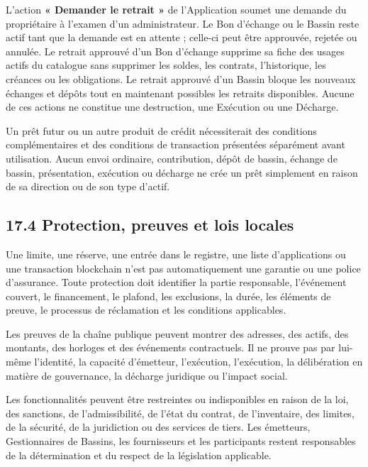 \documentclass[11pt]{article}
\begin{document}
L'action \textbf{« Demander le retrait »} de l'Application soumet une demande du propriétaire à l'examen d'un administrateur. Le Bon d'échange ou le Bassin reste actif tant que la demande est en attente ; celle-ci peut être approuvée, rejetée ou annulée. Le retrait approuvé d'un Bon d'échange supprime sa fiche des usages actifs du catalogue sans supprimer les soldes, les contrats, l'historique, les créances ou les obligations. Le retrait approuvé d'un Bassin bloque les nouveaux échanges et dépôts tout en maintenant possibles les retraits disponibles. Aucune de ces actions ne constitue une destruction, une Exécution ou une Décharge.

Un prêt futur ou un autre produit de crédit nécessiterait des conditions complémentaires et des conditions de transaction présentées séparément avant utilisation. Aucun envoi ordinaire, contribution, dépôt de bassin, échange de bassin, présentation, exécution ou décharge ne crée un prêt simplement en raison de sa direction ou de son type d'actif.

\subsection*{17.4 Protection, preuves et lois locales}

Une limite, une réserve, une entrée dans le registre, une liste d'applications ou une transaction blockchain n'est pas automatiquement une garantie ou une police d'assurance. Toute protection doit identifier la partie responsable, l'événement couvert, le financement, le plafond, les exclusions, la durée, les éléments de preuve, le processus de réclamation et les conditions applicables.

Les preuves de la chaîne publique peuvent montrer des adresses, des actifs, des montants, des horloges et des événements contractuels. Il ne prouve pas par lui-même l'identité, la capacité d'émetteur, l'exécution, l'exécution, la délibération en matière de gouvernance, la décharge juridique ou l'impact social.

Les fonctionnalités peuvent être restreintes ou indisponibles en raison de la loi, des sanctions, de l'admissibilité, de l'état du contrat, de l'inventaire, des limites, de la sécurité, de la juridiction ou des services de tiers. Les émetteurs, Gestionnaires de Bassins, les fournisseurs et les participants restent responsables de la détermination et du respect de la législation applicable.
\end{document}
